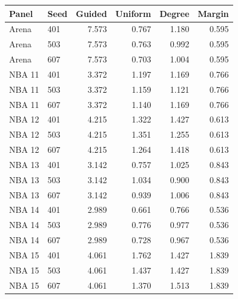 \begin{tabular}{llrrrr}
\toprule
Panel & Seed & Guided & Uniform & Degree & Margin\\
\midrule
Arena & 401 & 7.573 & 0.767 & 1.180 & 0.595\\
Arena & 503 & 7.573 & 0.763 & 0.992 & 0.595\\
Arena & 607 & 7.573 & 0.703 & 1.004 & 0.595\\
NBA 11 & 401 & 3.372 & 1.197 & 1.169 & 0.766\\
NBA 11 & 503 & 3.372 & 1.159 & 1.121 & 0.766\\
NBA 11 & 607 & 3.372 & 1.140 & 1.169 & 0.766\\
NBA 12 & 401 & 4.215 & 1.322 & 1.427 & 0.613\\
NBA 12 & 503 & 4.215 & 1.351 & 1.255 & 0.613\\
NBA 12 & 607 & 4.215 & 1.264 & 1.418 & 0.613\\
NBA 13 & 401 & 3.142 & 0.757 & 1.025 & 0.843\\
NBA 13 & 503 & 3.142 & 1.034 & 0.900 & 0.843\\
NBA 13 & 607 & 3.142 & 0.939 & 1.006 & 0.843\\
NBA 14 & 401 & 2.989 & 0.661 & 0.766 & 0.536\\
NBA 14 & 503 & 2.989 & 0.776 & 0.977 & 0.536\\
NBA 14 & 607 & 2.989 & 0.728 & 0.967 & 0.536\\
NBA 15 & 401 & 4.061 & 1.762 & 1.427 & 1.839\\
NBA 15 & 503 & 4.061 & 1.437 & 1.427 & 1.839\\
NBA 15 & 607 & 4.061 & 1.370 & 1.513 & 1.839\\
\bottomrule
\end{tabular}
